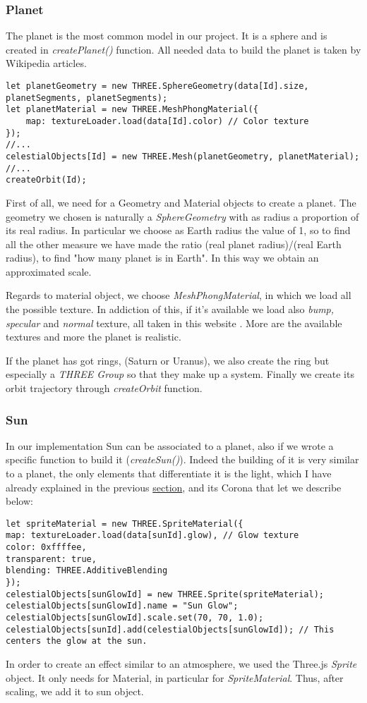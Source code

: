 \documentclass{article}
\begin{document}
\subsubsection{Planet} 
The planet is the most common model in our project. It is a sphere and is created in \textit{createPlanet()} function. All needed data to build the planet is taken by Wikipedia articles\cite{wikipedia}.
\begin{lstlisting}
let planetGeometry = new THREE.SphereGeometry(data[Id].size, planetSegments, planetSegments);
let planetMaterial = new THREE.MeshPhongMaterial({
	map: textureLoader.load(data[Id].color) // Color texture
});
//...
celestialObjects[Id] = new THREE.Mesh(planetGeometry, planetMaterial);
//...
createOrbit(Id);
\end{lstlisting}
First of all, we need for a Geometry and Material objects to create a planet. The geometry we chosen is naturally a \textit{SphereGeometry}\cite{documentation:threejs} with as radius a proportion of its real radius. In particular we choose as Earth radius the value of 1, so to find all the other measure we have made the ratio (real planet radius)/(real Earth radius), to find "how many planet is in Earth". In this way we obtain an approximated scale.
\par Regards to material object, we choose \textit{MeshPhongMaterial}\cite{documentation:threejs}, in which we load all the possible texture. In addiction of this, if it's available we load also \textit{bump, specular} and \textit{normal} texture, all taken in this website \cite{planetpixelemporium}. More are the available textures and more the planet is realistic.
\par If the planet has got rings, (Saturn or Uranus), we also create the ring but especially a \textit{THREE Group} so that they make up a system.
Finally we create its orbit trajectory through \textit{createOrbit} function.

\subsubsection{Sun}
In our implementation Sun can be associated to a planet, also if we wrote a specific function to build it (\textit{createSun()}). Indeed the building of it is very similar to a planet, the only elements that differentiate it is the light, which I have already explained in the previous \hyperref[subsec:pointlight]{section}, and its Corona that let we describe below:
\begin{lstlisting}
let spriteMaterial = new THREE.SpriteMaterial({
map: textureLoader.load(data[sunId].glow), // Glow texture
color: 0xffffee,
transparent: true,
blending: THREE.AdditiveBlending
});
celestialObjects[sunGlowId] = new THREE.Sprite(spriteMaterial);
celestialObjects[sunGlowId].name = "Sun Glow";
celestialObjects[sunGlowId].scale.set(70, 70, 1.0);
celestialObjects[sunId].add(celestialObjects[sunGlowId]); // This centers the glow at the sun.
\end{lstlisting}
In order to create an effect similar to an atmosphere, we used the Three.js \textit{Sprite}\cite{documentation:threejs} object. It only needs for Material, in particular for \textit{SpriteMaterial}\cite{documentation:threejs}. Thus, after scaling, we add it to sun object.
\end{document}
